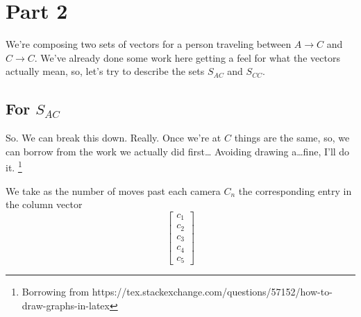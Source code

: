 \documentclass{article}
\begin{document}
    \section{Part 2}
        We're composing two sets of vectors for a person traveling
        between $A\rightarrow C$ and $C\rightarrow C$.
        We've already done some work here getting a feel for what
        the vectors actually mean, so, let's try to describe the sets
        $S_{AC}$ and $S_{CC}$.
        \subsection[Composing A to C]{For $S_{AC}$}
            So. We can break this down. Really. Once we're at
            $C$ things are the same, so, we can borrow from the
            work we actually did first\dots
            Avoiding drawing a\dots fine, I'll do it.
            \footnote{Borrowing from https://tex.stackexchange.com/questions/57152/how-to-draw-graphs-in-latex}
            \begin {center}
            \end{center}
            We take as the number of moves past each camera $C_n$ the
            corresponding entry in the column vector
            \[
            \begin{bmatrix}c_1\\c_2\\c_3\\c_4\\c_5\end{bmatrix}
            \]
\end{document}
